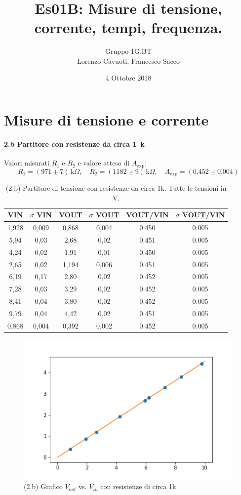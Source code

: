 \documentclass[10pt,a4paper]{article}
\author{Gruppo 1G.BT \\ Lorenzo Cavuoti, Francesco Sacco}
\title{Es01B: Misure di tensione, corrente, tempi, frequenza.}
\newcommand{\exn}{\phantom{xxx}}
\begin{document}
\date{4 Ottobre 2018}
\maketitle

\setcounter{section}{1}
\section{Misure di tensione e corrente}

\paragraph{2.b Partitore con resistenze da circa 1~k}
Valori misurati $R_1$ e $R_2$ e valore atteso di $A_\mathrm{exp}$:
\[
R_1 = ( 971 \pm 7 ) \,\mathrm{k}\Omega, \quad
R_2 = ( 1182 \pm 9 ) \,\mathrm{k}\Omega, \quad
A_\mathrm{exp} = ( 0.452 \pm 0.004 ) 
\]


\begin{table}[h]
\centering
\begin{tabular}{|c|c|c|c|c|c|}
\hline 
VIN& $\sigma$ VIN  &VOUT	 & $\sigma$ VOUT& VOUT/VIN & $\sigma$ VOUT/VIN \\
\hline 
1,928 & 0,009 & 0,868 & 0,004 & 0.450 &\exn 0.005 \\
5,94 & 0,03 & 2,68 & 0,02 & 0.451 &\exn 0.005 \\
4,24 & 0,02 & 1,91 & 0,01 & 0.450 &\exn 0.005 \\
2,65 & 0,02 & 1,194 & 0,006 & 0.451 &\exn 0.005 \\
6,19 & 0,17 & 2,80 & 0,02 & 0.452 &\exn 0.005 \\
7,28 & 0,03 & 3,29 & 0,02 & 0.452 &\exn 0.005 \\
8,41 & 0,04 & 3,80 & 0,02 & 0.452 &\exn 0.005 \\
9,79 & 0,04 & 4,42 & 0,02 & 0.451 &\exn 0.005 \\
0,868 & 0,004 & 0,392 & 0,002 & 0.452 &\exn 0.005 \\
\hline 
\end{tabular} 
\caption{(2.b) Partitore di tensione con resistenze da circa 1k. Tutte le tensioni in V.\label{t:par1}}
\end{table}

\begin{figure}[h]
\centering
\includegraphics[scale=0.6]{Dati_2b_plot.png}


\caption{(2.b) Grafico $V_{out}$ vs. $V_{in}$ con resistenze di circa 1k \label{f:par1}}
\end{figure}
\end{document}

